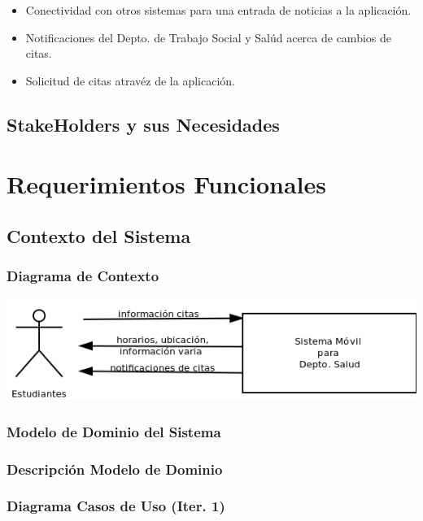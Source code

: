 \documentclass[12pt]{article}
\begin{document}
\begin{itemize}
	\item{Conectividad con otros sistemas para una entrada de noticias a la aplicaci\'on.}
	\item{Notificaciones del Depto. de Trabajo Social y Sal\'ud acerca de cambios de citas.}
	\item{Solicitud de citas atrav\'ez de la aplicaci\'on.}
\end{itemize}

\subsection{StakeHolders y sus Necesidades}

\section{Requerimientos Funcionales}

\subsection{Contexto del Sistema}

\subsubsection{Diagrama de Contexto}

\includegraphics[width=\linewidth]{"../Documentos/Diagramas/diagrama contexto"}

\subsubsection{Modelo de Dominio del Sistema}

\subsubsection{Descripci\'on Modelo de Dominio}

\subsubsection{Diagrama Casos de Uso (Iter. 1)}
\end{document}
